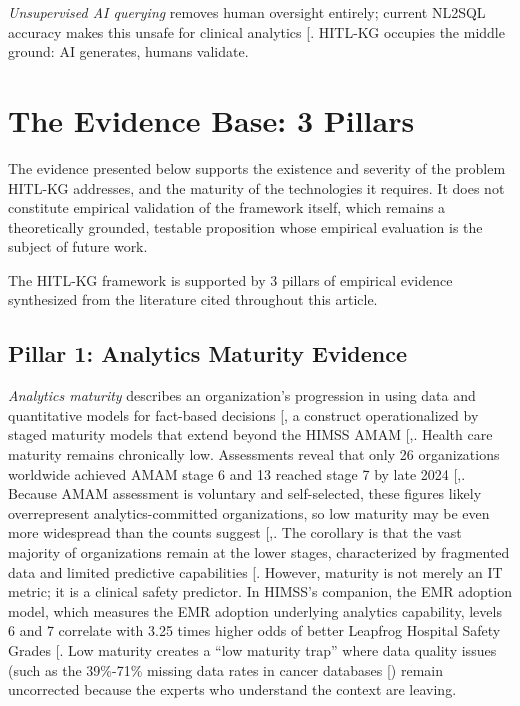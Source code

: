 \documentclass[
  american,
  11pt,
  letterpaper,
  oneside  ,captions=tableheading
]{scrartcl}
\begin{document}
\emph{Unsupervised AI querying} removes human oversight entirely;
current NL2SQL accuracy makes this unsafe for clinical analytics
{[}\citeproc{ref-ziletti2024}{38}{]}. HITL-KG occupies the middle
ground: AI generates, humans validate.

\section{The Evidence Base: 3
Pillars}\label{the-evidence-base-3-pillars}

The evidence presented below supports the existence and severity of the
problem HITL-KG addresses, and the maturity of the technologies it
requires. It does not constitute empirical validation of the framework
itself, which remains a theoretically grounded, testable proposition
whose empirical evaluation is the subject of future work.

The HITL-KG framework is supported by 3 pillars of empirical evidence
synthesized from the literature cited throughout this article.

\subsection{Pillar 1: Analytics Maturity
Evidence}\label{pillar-1-analytics-maturity-evidence}

\emph{Analytics maturity} describes an organization's progression in
using data and quantitative models for fact-based decisions
{[}\citeproc{ref-davenport2007}{39}{]}, a construct operationalized by
staged maturity models that extend beyond the HIMSS AMAM
{[},\citeproc{ref-langer2025}{41}{]}.
Health care maturity remains chronically low. Assessments reveal that
only 26 organizations worldwide achieved AMAM stage 6 and 13 reached
stage 7 by late 2024
{[},\citeproc{ref-himss2024news}{2}{]}.
Because AMAM assessment is voluntary and self-selected, these figures
likely overrepresent analytics-committed organizations, so low maturity
may be even more widespread than the counts suggest
{[},\citeproc{ref-tomaskovic1994}{43}{]}.
The corollary is that the vast majority of organizations remain at the
lower stages, characterized by fragmented data and limited predictive
capabilities {[}\citeproc{ref-health2020}{44}{]}. However, maturity is
not merely an IT metric; it is a clinical safety predictor. In HIMSS's
companion, the EMR adoption model, which measures the EMR adoption
underlying analytics capability, levels 6 and 7 correlate with 3.25
times higher odds of better Leapfrog Hospital Safety Grades
{[}\citeproc{ref-snowdon2024}{45}{]}. Low maturity creates a ``low
maturity trap'' where data quality issues (such as the 39\%-71\% missing
data rates in cancer databases {[}\citeproc{ref-yang2021}{46}{]}) remain
uncorrected because the experts who understand the context are leaving.
\end{document}
